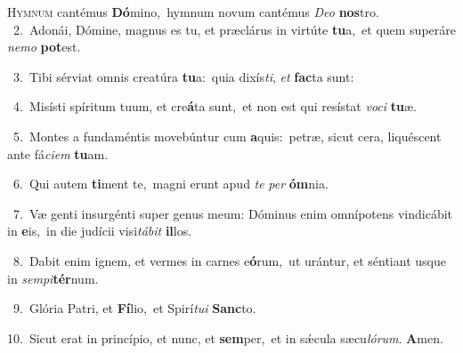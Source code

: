 \lettrine{\initial\textcolor{\initialcolor}{H}}{ymnum} cantémus \textbf{Dó}\-mino,~\star hymnum novum cantémus \textit{De}\-\textit{o} \textbf{nos}\-tro.\\
{\numbfont\textcolor{\numbcolor}{~2.}}~Adonái, Dómine, magnus es tu, et præclárus in virtúte \textbf{tu}\-a,~\star et quem superáre \textit{ne}\-\textit{mo} \textbf{pot}\-est.\par
{\numbfont\textcolor{\numbcolor}{~3.}}~Tibi sérviat omnis creatúra \textbf{tu}\-a:~\star quia dixís\-\textit{ti}\-, \textit{et} \textbf{fac}\-ta sunt:\par
{\numbfont\textcolor{\numbcolor}{~4.}}~Misísti spíritum tuum, et cre\-\textbf{á}\-ta sunt,~\star et non est qui resístat \textit{vo}\-\textit{ci} \textbf{tu}\-æ.\par
{\numbfont\textcolor{\numbcolor}{~5.}}~Montes a fundaméntis movebúntur cum \textbf{a}\-quis:~\star petræ, sicut cera, liquéscent ante fá\-\textit{ci}\-\textit{em} \textbf{tu}\-am.\par
{\numbfont\textcolor{\numbcolor}{~6.}}~Qui autem \textbf{ti}\-ment te,~\star magni erunt apud \textit{te} \textit{per} \textbf{óm}\-nia.\par
{\numbfont\textcolor{\numbcolor}{~7.}}~Væ genti insurgénti super genus meum: Dóminus enim omnípotens vindicábit in \textbf{e}\-is,~\star in die judícii visi\-\textit{tá}\-\textit{bit} \textbf{il}\-los.\par
{\numbfont\textcolor{\numbcolor}{~8.}}~Dabit enim ignem, et vermes in carnes e\-\textbf{ó}\-rum,~\star ut urántur, et séntiant usque in \textit{sem}\-\textit{pi}\textbf{tér}num.\par
{\numbfont\textcolor{\numbcolor}{~9.}}~Glória Patri, et \textbf{Fí}\-lio,~\star et Spirí\-\textit{tu}\-\textit{i} \textbf{Sanc}\-to.\par
{\numbfont\textcolor{\numbcolor}{10.}}~Sicut erat in princípio, et nunc, et \textbf{sem}\-per,~\star et in sǽcula sæcu\-\textit{ló}\-\textit{rum}. \textbf{A}\-men.\par
